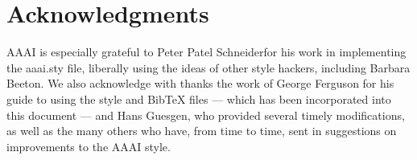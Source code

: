 \documentclass[letterpaper]{article} %
\begin{document}
%
%
%
%

\section{Acknowledgments}
AAAI is especially grateful to Peter Patel Schneiderfor his work in implementing the aaai.sty file, liberally using the ideas of other style hackers, including Barbara Beeton. We also acknowledge with thanks the work of George Ferguson for his guide to using the style and BibTeX files --- which has been incorporated into this document --- and Hans Guesgen, who provided several timely modifications, as well as the many others who have, from time to time, sent in suggestions on improvements to the AAAI style. 
\end{document}
